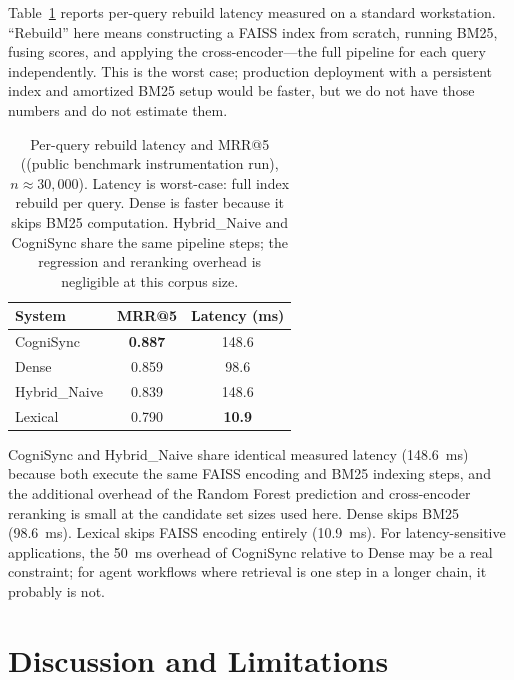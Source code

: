 \documentclass[sigconf]{acmart}
\begin{document}
Table~\ref{tab} reports per-query rebuild latency measured on a standard
workstation. ``Rebuild'' here means constructing a FAISS index from scratch,
running BM25, fusing scores, and applying the cross-encoder---the full pipeline
for each query independently. This is the worst case; production deployment
with a persistent index and amortized BM25 setup would be faster, but we do not
have those numbers and do not estimate them.

\begin{table}[t]
\centering
\caption{Per-query rebuild latency and MRR@5 ((public benchmark instrumentation run), $n \approx 30{,}000$).
Latency is worst-case: full index rebuild per query. Dense is faster because it
skips BM25 computation. Hybrid_Naive and CogniSync share the same pipeline
steps; the regression and reranking overhead is negligible at this corpus size.}
\label{tab}
\begin{tabular}{lcc}
\toprule
System & MRR@5 & Latency (ms) \\
\midrule
CogniSync & \textbf{0.887} & 148.6 \\
Dense & 0.859 & 98.6 \\
Hybrid_Naive & 0.839 & 148.6 \\
Lexical & 0.790 & \textbf{10.9} \\
\bottomrule
\end{tabular}
\end{table}

CogniSync and Hybrid_Naive share identical measured latency (148.6~ms) because
both execute the same FAISS encoding and BM25 indexing steps, and the additional
overhead of the Random Forest prediction and cross-encoder reranking is small
at the candidate set sizes used here. Dense skips BM25 (98.6~ms). Lexical skips
FAISS encoding entirely (10.9~ms). For latency-sensitive applications, the
50~ms overhead of CogniSync relative to Dense may be a real constraint; for
agent workflows where retrieval is one step in a longer chain, it probably is not.

\section{Discussion and Limitations}
\label{sec}
\end{document}
